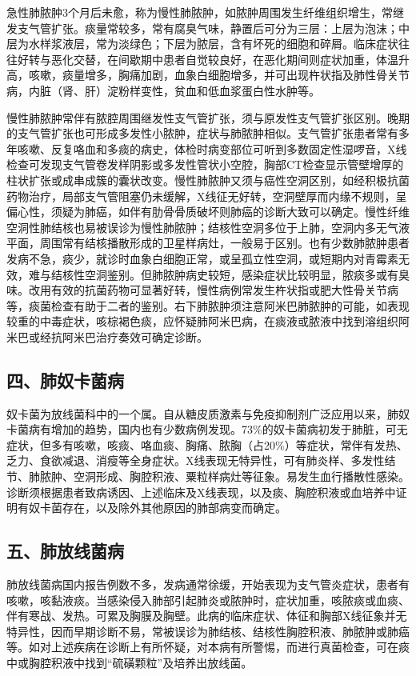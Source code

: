急性肺脓肿3个月后未愈，称为慢性肺脓肿，如脓肿周围发生纤维组织增生，常继发支气管扩张。痰量常较多，常有腐臭气味，静置后可分为三层：上层为泡沫；中层为水样浆液层，常为淡绿色；下层为脓层，含有坏死的细胞和碎屑。临床症状往往好转与恶化交替，在间歇期中患者自觉较良好，在恶化期间则症状加重，体温升高，咳嗽，痰量增多，胸痛加剧，血象白细胞增多，并可出现杵状指及肺性骨关节病，内脏（肾、肝）淀粉样变性，贫血和低血浆蛋白性水肿等。

慢性肺脓肿常伴有脓腔周围继发性支气管扩张，须与原发性支气管扩张区别。晚期的支气管扩张也可形成多发性小脓肿，症状与肺脓肿相似。支气管扩张患者常有多年咳嗽、反复咯血和多痰的病史，体检时病变部位可听到多数固定性湿啰音，X线检查可发现支气管卷发样阴影或多发性管状小空腔，胸部CT检查显示管壁增厚的柱状扩张或成串成簇的囊状改变。慢性肺脓肿又须与癌性空洞区别，如经积极抗菌药物治疗，局部支气管阻塞仍未缓解，X线征无好转，空洞壁厚而内缘不规则，呈偏心性，须疑为肺癌，如伴有肋骨骨质破坏则肺癌的诊断大致可以确定。慢性纤维空洞性肺结核也易被误诊为慢性肺脓肿；结核性空洞多位于上肺，空洞内多无气液平面，周围常有结核播散形成的卫星样病灶，一般易于区别。也有少数肺脓肿患者发病不急，痰少，就诊时血象白细胞正常，或呈孤立性空洞，或短期内对青霉素无效，难与结核性空洞鉴别。但肺脓肿病史较短，感染症状比较明显，脓痰多或有臭味。改用有效的抗菌药物可显著好转，慢性病例常发生杵状指或肥大性骨关节病等，痰菌检查有助于二者的鉴别。右下肺脓肿须注意阿米巴肺脓肿的可能，如表现较重的中毒症状，咳棕褐色痰，应怀疑肺阿米巴病，在痰液或脓液中找到溶组织阿米巴或经抗阿米巴治疗奏效可确定诊断。

\subsection{四、肺奴卡菌病}

奴卡菌为放线菌科中的一个属。自从糖皮质激素与免疫抑制剂广泛应用以来，肺奴卡菌病有增加的趋势，国内也有少数病例发现。73\%的奴卡菌病初发于肺脏，可无症状，但多有咳嗽，咳痰、咯血痰、胸痛、脓胸（占20\%）等症状，常伴有发热、乏力、食欲减退、消瘦等全身症状。X线表现无特异性，可有肺炎样、多发性结节、肺脓肿、空洞形成、胸腔积液、粟粒样病灶等征象。易发生血行播散性感染。诊断须根据患者致病诱因、上述临床及X线表现，以及痰、胸腔积液或血培养中证明有奴卡菌存在，以及除外其他原因的肺部病变而确定。

\subsection{五、肺放线菌病}

肺放线菌病国内报告例数不多，发病通常徐缓，开始表现为支气管炎症状，患者有咳嗽，咳黏液痰。当感染侵入肺部引起肺炎或脓肿时，症状加重，咳脓痰或血痰、伴有寒战、发热。可累及胸膜及胸壁。此病的临床症状、体征和胸部X线征象并无特异性，因而早期诊断不易，常被误诊为肺结核、结核性胸腔积液、肺脓肿或肺癌等。如对上述疾病在诊断上有所怀疑，对本病有所警惕，而进行真菌检查，可在痰中或胸腔积液中找到“硫磺颗粒”及培养出放线菌。

